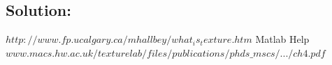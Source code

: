 \documentclass{article}
\begin{document}
\subsection{Solution:}

%

\begin{thebibliography}{9}
$http://www.fp.ucalgary.ca/mhallbey/what_is_texture.htm$
Matlab Help
$www.macs.hw.ac.uk/texturelab/files/publications/phds\_mscs/.../ch4.pdf$
\end{thebibliography}
\end{document}
